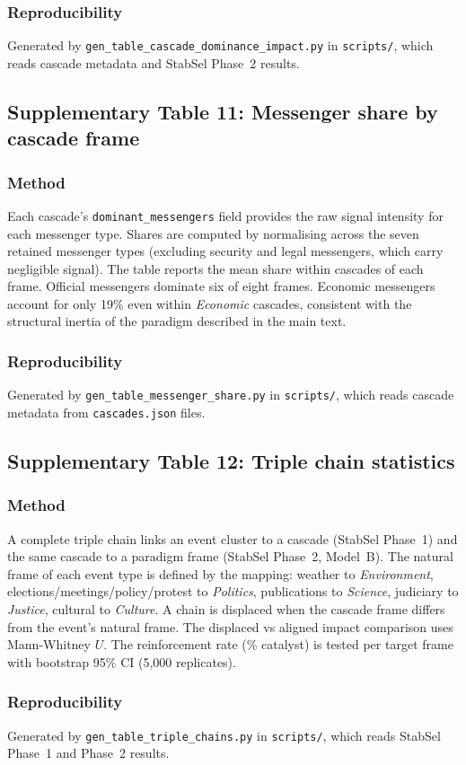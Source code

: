 \subsubsection*{Reproducibility}
Generated by \texttt{gen\_table\_cascade\_dominance\_impact.py} in \texttt{scripts/},
which reads cascade metadata and StabSel Phase~2 results.


\newpage
\subsection*{Supplementary Table 11: Messenger share by cascade frame}



\subsubsection*{Method}
Each cascade's \texttt{dominant\_messengers} field provides the raw signal intensity for each messenger type. Shares are computed by normalising across the seven retained messenger types (excluding security and legal messengers, which carry negligible signal). The table reports the mean share within cascades of each frame. Official messengers dominate six of eight frames. Economic messengers account for only 19\% even within \emph{Economic} cascades, consistent with the structural inertia of the paradigm described in the main text.

\subsubsection*{Reproducibility}
Generated by \texttt{gen\_table\_messenger\_share.py} in \texttt{scripts/},
which reads cascade metadata from \texttt{cascades.json} files.


\newpage
\subsection*{Supplementary Table 12: Triple chain statistics}



\subsubsection*{Method}
A complete triple chain links an event cluster to a cascade (StabSel Phase~1) and the same cascade to a paradigm frame (StabSel Phase~2, Model~B). The natural frame of each event type is defined by the mapping: weather to \emph{Environment}, elections/meetings/policy/protest to \emph{Politics}, publications to \emph{Science}, judiciary to \emph{Justice}, cultural to \emph{Culture}. A chain is displaced when the cascade frame differs from the event's natural frame. The displaced vs aligned impact comparison uses Mann-Whitney $U$. The reinforcement rate (\% catalyst) is tested per target frame with bootstrap 95\% CI (5,000 replicates).

\subsubsection*{Reproducibility}
Generated by \texttt{gen\_table\_triple\_chains.py} in \texttt{scripts/},
which reads StabSel Phase~1 and Phase~2 results.


